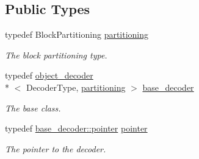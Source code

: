 \subsection*{Public Types}
\begin{DoxyCompactItemize}
\item 
\hypertarget{classkodo_1_1shallow__storage__decoder_a664f1059aad4a45d2b5cc6b62aeb9f0d}{typedef Block\-Partitioning \hyperlink{classkodo_1_1shallow__storage__decoder_a664f1059aad4a45d2b5cc6b62aeb9f0d}{partitioning}}\label{classkodo_1_1shallow__storage__decoder_a664f1059aad4a45d2b5cc6b62aeb9f0d}

\begin{DoxyCompactList}\small\item\em The block partitioning type. \end{DoxyCompactList}\item 
typedef \hyperlink{classkodo_1_1object__decoder}{object\-\_\-decoder}\\*
$<$ Decoder\-Type, \hyperlink{classkodo_1_1shallow__storage__decoder_a664f1059aad4a45d2b5cc6b62aeb9f0d}{partitioning} $>$ \hyperlink{classkodo_1_1shallow__storage__decoder_a0f36d9fb6c80894d613f0b86527d2198}{base\-\_\-decoder}
\begin{DoxyCompactList}\small\item\em The base class. \end{DoxyCompactList}\item 
\hypertarget{classkodo_1_1shallow__storage__decoder_a97447310b8e6597f8f9fd7c608751081}{typedef \hyperlink{classkodo_1_1object__decoder_a2d53e4d4369d535ca146ac5c912d9310}{base\-\_\-decoder\-::pointer} \hyperlink{classkodo_1_1shallow__storage__decoder_a97447310b8e6597f8f9fd7c608751081}{pointer}}\label{classkodo_1_1shallow__storage__decoder_a97447310b8e6597f8f9fd7c608751081}

\begin{DoxyCompactList}\small\item\em The pointer to the decoder. \end{DoxyCompactList}\end{DoxyCompactItemize}
